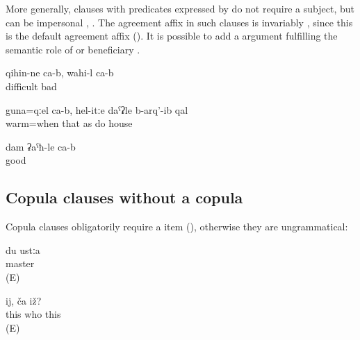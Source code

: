 More generally,  clauses with predicates expressed by  do not require a subject, but can be impersonal , . The  agreement affix in such clauses is invariably , since this is the default agreement affix (). It is possible to add a  argument fulfilling the semantic role of  or beneficiary .
%
\begin{exe}
	\ex	\label{ex:‎It is difficult, it is bad}
	\gll	qihin-ne	ca-b,	wahi-l	ca-b	\\
		difficult		bad		\\
	\glt	{}

	\ex	\label{ex:‎When it is warm (i.e. in warm places) the houses are built like this}
	\gll	guna=qːel	ca-b,	hel-itːe	daˁʡle	b-arq'-ib	qal\\
		warm=when		that	as	do	house	\\
	\glt	{}

	\ex	\label{ex:I am well}
	\gll	dam ʡaˁħ-le ca-b\\
			good	\\
	\glt	{}
\end{exe}



\subsection{Copula clauses without a copula}
\label{ssec:Copula clauses without a copula}

Copula clauses obligatorily require a  item (), otherwise they are ungrammatical: 
%
\begin{exe}
	\ex	\label{ex:I am a master}
	\gll	{*} du	ustːa\\
		{}		master\\
	\glt	{} (E)

	\ex	\label{ex:This, who is it}
	\gll	{*}	ij,	ča	iž?\\
		{}	this	who	this \\
	\glt	{} (E)
\end{exe}

